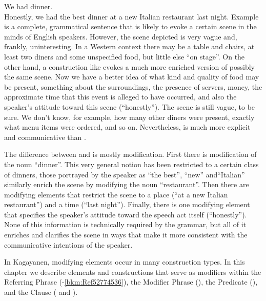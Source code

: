 \ea
\label{bkm:Ref441656793}
    \ea 
    \label{bkm:Ref441656793-a}
    We had dinner. \\
    \ex
    \label{bkm:Ref441656793-b}
    Honestly, we had the best dinner at a new Italian restaurant last night.
    \z
\z
Example  is a complete, grammatical sentence that is likely to evoke a certain scene in the minds of English speakers. However, the scene depicted is very vague and, frankly, uninteresting. In a Western context there may be a table and chairs, at least two diners and some unspecified food, but little else “on stage”.  On the other hand, a construction like  evokes a much more enriched version of possibly the same scene. Now we have a better idea of what kind and quality of food may be present, something about the surroundings, the presence of servers, money, the approximate time that this event is alleged to have occurred, and also the speaker’s attitude toward this scene (“honestly”). The scene is still vague, to be sure. We don’t know, for example, how many other diners were present, exactly what menu items were ordered, and so on. Nevertheless,  is much more explicit and communicative than .

The difference between  and  is mostly modification. First there is modification of the noun “dinner”.  This very general notion has been restricted to a certain class of dinners, those  portrayed by the speaker as “the best”, “new” and``Italian” similarly enrich the scene by modifying the noun “restaurant”. Then there are modifying elements that restrict the scene to a place (“at a new Italian restaurant”) and a time (“last night”). Finally, there is one modifying element that specifies the speaker’s attitude toward the speech act itself (“honestly”). None of this information is technically required by the grammar, but all of it enriches and clarifies the scene in ways that make it more consistent with the communicative intentions of the speaker.

In Kagayanen, modifying elements occur in many construction types. In this chapter we describe elements and constructions that serve as modifiers within the Referring Phrase (-\ref{bkm:Ref52774536}), the Modifier Phrase (), the Predicate  (), and the Clause ( and ).

